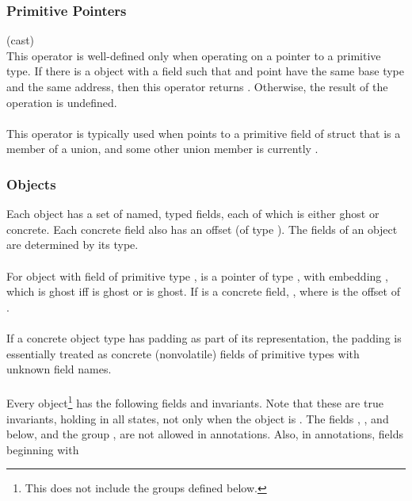 \documentclass[preprint,nocopyrightspace]{sigplanconf}
\begin{document}
{{\subsubsection{Primitive Pointers}
 (cast)\\
This operator is well-defined only when operating on a pointer  to a
primitive type. If there is a \vcc{\valid} object  with a field 
such that  and  point have the same base type and
the same address, then this operator returns . Otherwise,
the result of the operation is undefined.
\\\\
This operator is typically used when  points to a primitive
field of struct that is a member of a union, and some other union
member is currently \vcc{\valid}.  

\subsubsection{Objects}

Each object has a set of named, typed fields, 
each of which is either ghost or concrete. Each
concrete field also has an offset (of type ). 
The fields of an object are determined by its type. 
\\\\
For object  with field  of primitive type , 
 is a pointer of type , with 
embedding , which is
ghost iff  is ghost or  is ghost. If  is a
concrete field, ,
where  is the offset of . 
\\\\
If a concrete object type has padding as part of its representation, the
padding is essentially treated as concrete (nonvolatile) fields of
primitive types with unknown field names.
\\\\
Every object\footnote{This does not include the  groups defined
below.} has the following fields and invariants. Note that these
are true invariants, holding in all states, not only when the object
is \vcc{\closed}. The fields \vcc{\version}, ,
and \vcc{\blobifiable} below, and the
group \vcc{\ownerOb}, are not allowed in annotations. Also, in
annotations, fields beginning with }}
\end{document}
